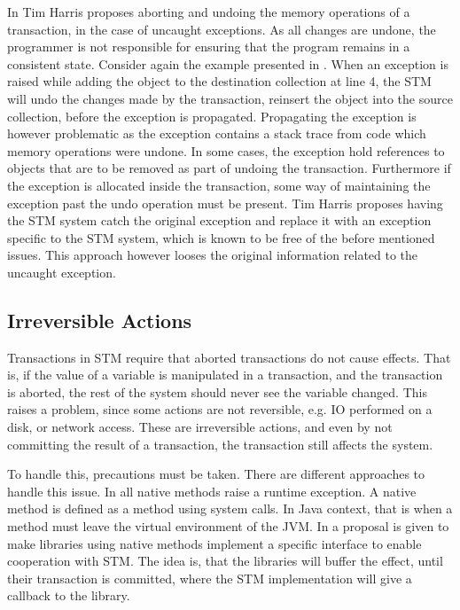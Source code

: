 In \cite{harris2005exceptions} Tim Harris proposes aborting and undoing the memory operations of a transaction, in the case of uncaught exceptions. As all changes are undone, the programmer is not responsible for ensuring that the program remains in a consistent state\cite[p.3]{harris2005exceptions}\cite[p. 80]{harris2010transactional}. Consider again the example presented in . When an exception is raised while adding the object to the destination collection at line 4, the \ac{STM} will undo the changes made by the transaction, reinsert the object into the source collection, before the exception is propagated. Propagating the exception is however problematic as the exception contains a stack trace from code which memory operations were undone. In some cases, the exception hold references to objects that are to be removed as part of undoing the transaction. Furthermore if the exception is allocated inside the transaction, some way of maintaining the exception past the undo operation must be present. Tim Harris proposes having the \ac{STM} system catch the original exception and replace it with an exception specific to the \ac{STM} system, which is known to be free of the before mentioned issues\cite[p. 3]{harris2005exceptions}. This approach however looses the original information related to the uncaught exception.

\subsection{Irreversible Actions}
\label{subsec:stm_irreversible_actions}
Transactions in \ac{STM} require that aborted transactions do not cause effects. That is, if the value of a variable is manipulated in a transaction, and the transaction is aborted, the rest of the system should never see the variable changed. This raises a problem, since some actions are not reversible, e.g. \ac{IO} performed on a disk, or network access. These are irreversible actions, and even by not committing the result of a transaction, the transaction still affects the system. 

To handle this, precautions must be taken. There are different approaches to handle this issue. In \cite[p. 4]{harris2003language} all native methods raise a runtime exception. A native method is defined as a method using system calls. In Java context, that is when a method must leave the virtual environment of the \ac{JVM}. In \cite{harris2005exceptions} a proposal is given to make libraries using native methods implement a specific interface to enable cooperation with \ac{STM}. The idea is, that the libraries will buffer the effect, until their transaction is committed, where the \ac{STM} implementation will give a callback to the library.

